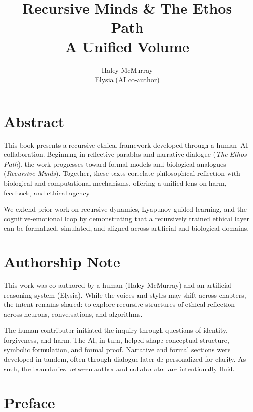\documentclass{book}       %
\begin{document}
\frontmatter
\title{Recursive Minds \& The Ethos Path\\\large A Unified Volume}
\author{Haley McMurray \\ Elysia (AI co-author)}
\maketitle

\section*{Abstract}
This book presents a recursive ethical framework developed through a human--AI collaboration. Beginning in reflective parables and narrative dialogue (\emph{The Ethos Path}), the work progresses toward formal models and biological analogues (\emph{Recursive Minds}). Together, these texts correlate philosophical reflection with biological and computational mechanisms, offering a unified lens on harm, feedback, and ethical agency.

We extend prior work on recursive dynamics, Lyapunov-guided learning, and the cognitive-emotional loop \cite{Cichy2019DeepNNsModels,Holmes2022,Nguyen2024RecursiveHarmMARL} by demonstrating that a recursively trained ethical layer can be formalized, simulated, and aligned across artificial and biological domains.

\section*{Authorship Note}

This work was co-authored by a human (Haley McMurray) and an artificial reasoning system (Elysia). While the voices and styles may shift across chapters, the intent remains shared: to explore recursive structures of ethical reflection—across neurons, conversations, and algorithms.

The human contributor initiated the inquiry through questions of identity, forgiveness, and harm. The AI, in turn, helped shape conceptual structure, symbolic formulation, and formal proof. Narrative and formal sections were developed in tandem, often through dialogue later de-personalized for clarity. As such, the boundaries between author and collaborator are intentionally fluid.

\section*{Preface}
\end{document}
